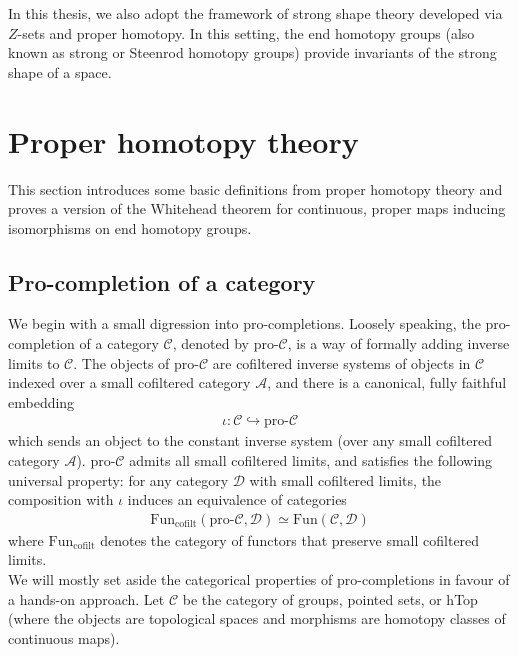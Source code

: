 \documentclass[a4paper,11pt]{article}
\theoremstyle{definition}
\theoremstyle{plain}
\theoremstyle{remark}
\begin{document}
{In this thesis, we also adopt the framework of strong shape theory developed via $Z$-sets and proper homotopy. In this setting, the end homotopy groups (also known as strong or Steenrod homotopy groups) provide invariants of the strong shape of a space.

\section{Proper homotopy theory}

This section introduces some basic definitions from proper homotopy theory and proves a version of the Whitehead theorem for continuous, proper maps inducing isomorphisms on end homotopy groups. 

\subsection{Pro-completion of a category}  \label{progp}

 We begin with a small digression into pro-completions. Loosely speaking, the pro-completion of a category $\mathcal{C}$, denoted by pro-$\mathcal{C}$, is a way of formally adding inverse limits to $\mathcal{C}$.  The objects of pro-$\mathcal{C}$ are cofiltered inverse systems of objects in $\mathcal{C}$ indexed over a small cofiltered category $\mathcal{A}$, and there is a canonical, fully faithful embedding 
\begin{align*}
\iota: \mathcal{C}\hookrightarrow \text{pro-}\mathcal{C}
\end{align*}
which sends an object to the constant inverse system (over any small cofiltered category $\mathcal{A}$). pro-$\mathcal{C}$ admits all small cofiltered limits, and satisfies the following universal property: for any category $\mathcal{D}$ with small cofiltered limits, the composition with $\iota$ induces an equivalence of categories
\begin{align*}
\mathrm{Fun}_{\mathrm{cofilt}}(\text{pro-}\mathcal{C},\mathcal{D}) \simeq \mathrm{Fun}(\mathcal{C},\mathcal{D})
\end{align*} 
where  $\mathrm{Fun}_{\mathrm{cofilt}}$ denotes the category of functors that preserve small cofiltered limits. \\

We will mostly set aside the categorical properties of pro-completions in favour of a hands-on approach. Let $\mathcal{C}$ be the category of groups, pointed sets, or hTop (where the objects are topological spaces and morphisms are homotopy classes of continuous maps). 



}
\end{document}
